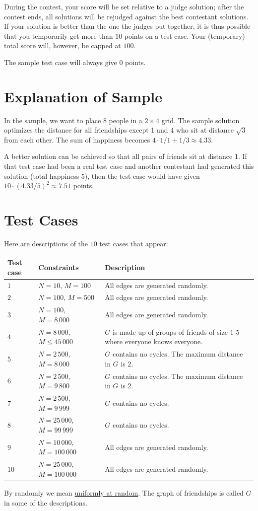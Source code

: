 During the contest, your score will be set relative to a judge solution;
after the contest ends, all solutions will be rejudged against the best contestant solutions.
If your solution is better than the one the judges put together, it is thus possible that you temporarily get more than $10$ points on a test case.
Your (temporary) total score will, however, be capped at $100$.

The sample test case will always give $0$ points.


\section*{Explanation of Sample}
In the sample, we want to place 8 people in a $2 \times 4$ grid.
The sample solution optimizes the distance for all friendships except 1 and 4 who sit at distance $\sqrt 3$ from each other.
The sum of happiness becomes $4 \cdot 1/1 + 1/3 \approx 4.33$.

A better solution can be achieved so that all pairs of friends sit at distance 1.
If that test case had been a real test case and another contestant had generated this solution
(total happiness $5$), then the test case would have given $10 \cdot (4.33 / 5)^2 \approx 7.51$ points.

\section*{Test Cases}
Here are descriptions of the $10$ test cases that appear:

\noindent
\begin{tabular}{| l | l | l |}
\hline
Test case & Constraints                       & Description \\ \hline
$1$       & $N = 10$, $M = 100$           & All edges are generated randomly. \\ \hline
$2$       & $N = 100$, $M = 500$          & All edges are generated randomly. \\ \hline
$3$       & $N = 100$, $M = 8\,000$       & All edges are generated randomly. \\ \hline
$4$       & $N = 8\,000$, $M \le 45\,000$ & $G$ is made up of groups of friends of size $1$-$5$ where everyone knows everyone. \\ \hline
$5$       & $N = 2\,500$, $M = 8\,000$    & $G$ contains no cycles. The maximum distance in $G$ is $2$. \\ \hline
$6$       & $N = 2\,500$, $M = 9\,800$    & $G$ contains no cycles. The maximum distance in $G$ is $2$. \\ \hline
$7$       & $N = 2\,500$, $M = 9\,999$    & $G$ contains no cycles. \\ \hline
$8$       & $N = 25\,000$, $M = 99\,999$  & $G$ contains no cycles. \\ \hline
$9$       & $N = 10\,000$, $M = 100\,000$ & All edges are generated randomly. \\ \hline
$10$      & $N = 25\,000$, $M = 100\,000$ & All edges are generated randomly. \\ \hline
\end{tabular}

By randomly we mean \href{https://en.wikipedia.org/wiki/Discrete_uniform_distribution}{uniformly at random}.
The graph of friendships is called $G$ in some of the descriptions.
